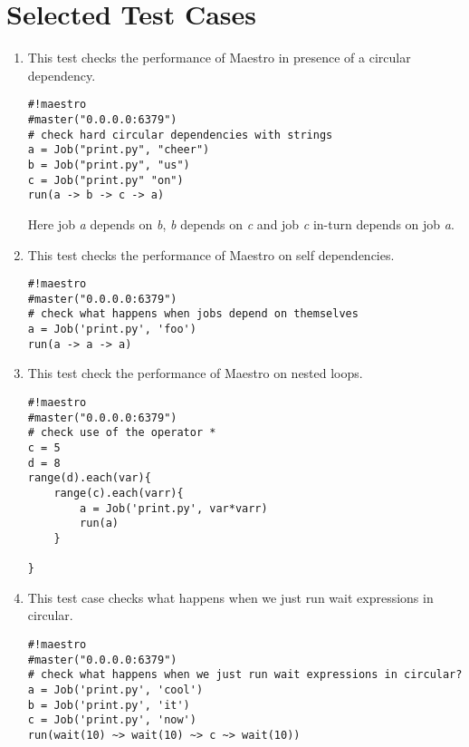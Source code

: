 \section{Selected Test Cases}
\begin{enumerate}

\item This test checks the performance of Maestro in presence of a circular dependency. 
\begin{verbatim}
#!maestro
#master("0.0.0.0:6379")
# check hard circular dependencies with strings
a = Job("print.py", "cheer")
b = Job("print.py", "us")
c = Job("print.py" "on")
run(a -> b -> c -> a)
\end{verbatim}
Here job \textit{a} depends on \textit{b}, \textit{b} depends on \textit{c} and job \textit{c} in-turn depends on job \textit{a}.

\item This test checks the performance of Maestro on self dependencies.
\begin{verbatim}
#!maestro
#master("0.0.0.0:6379")
# check what happens when jobs depend on themselves
a = Job('print.py', 'foo')
run(a -> a -> a)
\end{verbatim}
\newpage
\noindent \item This test check the performance of Maestro on nested loops.
\begin{verbatim}
#!maestro
#master("0.0.0.0:6379")
# check use of the operator *
c = 5
d = 8
range(d).each(var){
	range(c).each(varr){
		a = Job('print.py', var*varr)
		run(a)
	}

}
\end{verbatim}

\item This test case checks what happens when we just run wait expressions in circular.
\begin{verbatim}
#!maestro
#master("0.0.0.0:6379")
# check what happens when we just run wait expressions in circular?
a = Job('print.py', 'cool')
b = Job('print.py', 'it')
c = Job('print.py', 'now')
run(wait(10) ~> wait(10) ~> c ~> wait(10))
\end{verbatim}

\end{enumerate}
